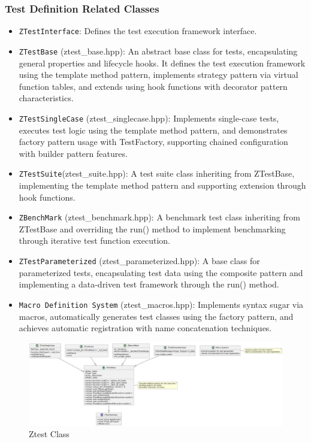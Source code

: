 \documentclass{article}
\begin{document}
\subsubsection{Test Definition Related Classes}
\begin{itemize}
    \item \texttt{ZTestInterface}: Defines the test execution framework interface.
    \item \texttt{ZTestBase} (ztest\_base.hpp): An abstract base class for tests, encapsulating general properties and lifecycle hooks. It defines the test execution framework using the template method pattern, implements strategy pattern via virtual function tables, and extends using hook functions with decorator pattern characteristics.
    \item \texttt{ZTestSingleCase} (ztest\_singlecase.hpp): Implements single-case tests, executes test logic using the template method pattern, and demonstrates factory pattern usage with TestFactory, supporting chained configuration with builder pattern features.
    \item \texttt{ZTestSuite}(ztest\_suite.hpp): A test suite class inheriting from ZTestBase, implementing the template method pattern and supporting extension through hook functions.
    \item \texttt{ZBenchMark} (ztest\_benchmark.hpp): A benchmark test class inheriting from ZTestBase and overriding the run() method to implement benchmarking through iterative test function execution.
    \item \texttt{ZTestParameterized} (ztest\_parameterized.hpp): A base class for parameterized tests, encapsulating test data using the composite pattern and implementing a data-driven test framework through the run() method.
    \item \texttt{Macro Definition System} (ztest\_macros.hpp): Implements syntax sugar via macros, automatically generates test classes using the factory pattern, and achieves automatic registration with name concatenation techniques.
\end{itemize}
\begin{figure}[H]
    \centering
    \includegraphics[width = \textwidth]{img/c1.png} %
    \caption{ Ztest Class}
    \label{fig:ztest class }
\end{figure}
\end{document}
